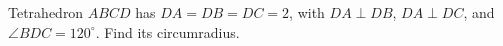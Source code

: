 Tetrahedron $ABCD$ has $DA=DB=DC=2$, with $DA\perp DB$, $DA\perp DC$, and $\angle BDC=120^\circ$. Find its circumradius.
